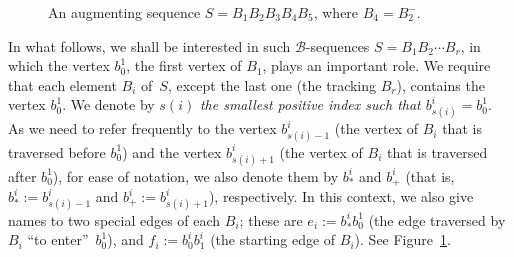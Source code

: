\documentclass[12pt,reqno,a4paper]{amsart}
\begin{document}
\begin{figure}[b]
	\caption{An augmenting sequence \(S =
          B_1B_2B_3B_4B_5\), where \(B_4=B_2^-.\)}
	\label{fig:augmenting}
\end{figure}



In what follows, we shall be interested in such
\(\mathcal{B}\)-sequences
\(S = B_1B_2\cdots B_r\),
in which the vertex $b_0^1$, the first vertex of $B_1$, plays an
important role. We require that each element
$B_i$ of~\(S\), except the last one (the tracking $B_r$),  contains the vertex $b_0^1$. We
denote by $s(i)$ \emph{the smallest positive index such that
  $b_{s(i)}^i = b_0^1$}. As we need to refer frequently to the vertex
$b_{s(i)-1}^i$ (the vertex of $B_i$ that is traversed before 
$b_0^1$) and the vertex $b_{s(i)+1}^i$ (the vertex of $B_i$ that is
traversed after  $b_0^1$), for ease of notation, we also denote
them by $b_*^i$ and $b_+^i$ (that is, $b_*^i := b_{s(i)-1}^i$ and
$b_+^i := b_{s(i)+1}^i$), respectively. 
In this context, we also give names to two special edges
of each $B_i$; these are $e_i := b_*^ib_0^1$  (the
edge traversed by $B_i$ ``to enter''~$b_0^1$), and $f_i := b_0^ib_1^i$ 
(the starting edge of  $B_i$). See Figure~\ref{fig:augmenting}.



\end{document}
